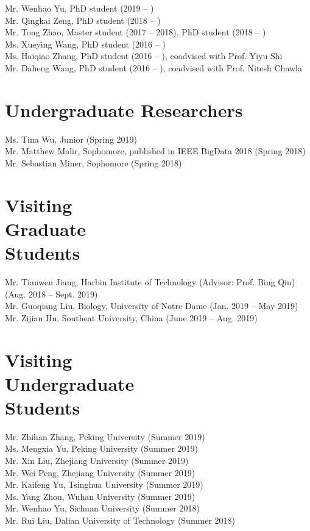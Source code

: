 \documentclass[margin, 9pt]{res}
\begin{document}
\begin{resume}
{Mr. Wenhao Yu, PhD student (2019 -- )} \\
{Mr. Qingkai Zeng, PhD student (2018 -- )} \\
{Mr. Tong Zhao, Master student (2017 -- 2018), PhD student (2018 -- )} \\
{Ms. Xueying Wang, PhD student (2016 -- )} \\
{Ms. Haiqiao Zhang, PhD student (2016 -- ), coadvised with Prof. Yiyu Shi} \\
{Mr. Daheng Wang, PhD student (2016 -- ), coadvised with Prof. Nitesh Chawla}

\section{Undergraduate Researchers}

{Ms. Tina Wu}, Junior (Spring 2019) \\
{Mr. Matthew Malir}, Sophomore, published in IEEE BigData 2018 (Spring 2018) \\
{Mr. Sebastian Miner}, Sophomore (Spring 2018)

\section{Visiting \\ Graduate \\ Students}

{Mr. Tianwen Jiang, Harbin Institute of Technology (Advisor: Prof. Bing Qin)} (Aug. 2018 -- Sept. 2019) \\
{Mr. Guoqiang Liu, Biology, University of Notre Dame} (Jan. 2019 -- May 2019) \\
{Mr. Zijian Hu, Southeat University, China} (June 2019 -- Aug. 2019)

\section{Visiting \\ Undergraduate \\ Students}

{Mr. Zhihan Zhang, Peking University} (Summer 2019) \\
{Ms. Mengxia Yu, Peking University} (Summer 2019) \\
{Mr. Xin Liu, Zhejiang University} (Summer 2019) \\
{Mr. Wei Peng, Zhejiang University} (Summer 2019) \\
{Mr. Kaifeng Yu, Tsinghua University} (Summer 2019) \\
{Ms. Yang Zhou, Wuhan University} (Summer 2019) \\
{Mr. Wenhao Yu, Sichuan University} (Summer 2018) \\
{Mr. Rui Liu, Dalian University of Technology} (Summer 2018)


\end{resume}
\end{document}
